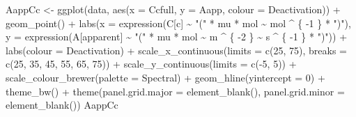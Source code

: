 \documentclass[
]{krantz}
\makeatletter
\newenvironment{Shaded}{\begin{snugshade}}{\end{snugshade}}
\newcommand{\AttributeTok}[1]{\textcolor[rgb]{0.77,0.63,0.00}{#1}}
\newcommand{\DecValTok}[1]{\textcolor[rgb]{0.00,0.00,0.81}{#1}}
\newcommand{\FunctionTok}[1]{\textcolor[rgb]{0.00,0.00,0.00}{#1}}
\newcommand{\NormalTok}[1]{#1}
\newcommand{\OtherTok}[1]{\textcolor[rgb]{0.56,0.35,0.01}{#1}}
\newcommand{\SpecialCharTok}[1]{\textcolor[rgb]{0.00,0.00,0.00}{#1}}
\newcommand{\StringTok}[1]{\textcolor[rgb]{0.31,0.60,0.02}{#1}}
\newenvironment{kframe}{%
\medskip{}
\setlength{\fboxsep}{.8em}
 \def\at@end@of@kframe{}%
 \ifinner\ifhmode%
  \def\at@end@of@kframe{\end{minipage}}%
  \begin{minipage}{\columnwidth}%
 \fi\fi%
 \def\FrameCommand##1{\hskip\@totalleftmargin \hskip-\fboxsep
 \colorbox{shadecolor}{##1}\hskip-\fboxsep
     \hskip-\linewidth \hskip-\@totalleftmargin \hskip\columnwidth}%
 \MakeFramed {\advance\hsize-\width
   \@totalleftmargin\z@ \linewidth\hsize
   \@setminipage}}%
 {\par\unskip\endMakeFramed%
 \at@end@of@kframe}
\renewenvironment{Shaded}{\begin{kframe}}{\end{kframe}}
\makeatother
\begin{document}
\begin{Shaded}
\begin{Highlighting}[]
\NormalTok{AappCc }\OtherTok{\textless{}{-}}
  \FunctionTok{ggplot}\NormalTok{(data, }\FunctionTok{aes}\NormalTok{(}\AttributeTok{x =}\NormalTok{ Ccfull, }\AttributeTok{y =}\NormalTok{ Aapp, }\AttributeTok{colour =}\NormalTok{ Deactivation)) }\SpecialCharTok{+}
  \FunctionTok{geom\_point}\NormalTok{() }\SpecialCharTok{+}
  \FunctionTok{labs}\NormalTok{(}\AttributeTok{x =} \FunctionTok{expression}\NormalTok{(C[c] }\SpecialCharTok{\textasciitilde{}} \StringTok{"("} \SpecialCharTok{*}\NormalTok{ mu }\SpecialCharTok{*}\NormalTok{ mol }\SpecialCharTok{\textasciitilde{}}\NormalTok{ mol }\SpecialCharTok{\^{}}\NormalTok{ \{}
    \SpecialCharTok{{-}}\DecValTok{1}
\NormalTok{  \} }\SpecialCharTok{*} \StringTok{")"}\NormalTok{),}
  \AttributeTok{y =} \FunctionTok{expression}\NormalTok{(A[apparent] }\SpecialCharTok{\textasciitilde{}} \StringTok{"("} \SpecialCharTok{*}\NormalTok{ mu }\SpecialCharTok{*}\NormalTok{ mol }\SpecialCharTok{\textasciitilde{}}\NormalTok{ m }\SpecialCharTok{\^{}}\NormalTok{ \{}
    \SpecialCharTok{{-}}\DecValTok{2}
\NormalTok{  \} }\SpecialCharTok{\textasciitilde{}}\NormalTok{ s }\SpecialCharTok{\^{}}\NormalTok{ \{}
    \SpecialCharTok{{-}}\DecValTok{1}
\NormalTok{  \} }\SpecialCharTok{*} \StringTok{")"}\NormalTok{)) }\SpecialCharTok{+}
  \FunctionTok{labs}\NormalTok{(}\AttributeTok{colour =} \StringTok{\textquotesingle{}Deactivation\textquotesingle{}}\NormalTok{) }\SpecialCharTok{+}
  \FunctionTok{scale\_x\_continuous}\NormalTok{(}\AttributeTok{limits =} \FunctionTok{c}\NormalTok{(}\DecValTok{25}\NormalTok{, }\DecValTok{75}\NormalTok{),}
                     \AttributeTok{breaks =} \FunctionTok{c}\NormalTok{(}\DecValTok{25}\NormalTok{, }\DecValTok{35}\NormalTok{, }\DecValTok{45}\NormalTok{, }\DecValTok{55}\NormalTok{, }\DecValTok{65}\NormalTok{, }\DecValTok{75}\NormalTok{)) }\SpecialCharTok{+}
  \FunctionTok{scale\_y\_continuous}\NormalTok{(}\AttributeTok{limits =} \FunctionTok{c}\NormalTok{(}\SpecialCharTok{{-}}\DecValTok{5}\NormalTok{, }\DecValTok{5}\NormalTok{)) }\SpecialCharTok{+}
  \FunctionTok{scale\_colour\_brewer}\NormalTok{(}\AttributeTok{palette =} \StringTok{\textquotesingle{}Spectral\textquotesingle{}}\NormalTok{) }\SpecialCharTok{+}
  \FunctionTok{geom\_hline}\NormalTok{(}\AttributeTok{yintercept =} \DecValTok{0}\NormalTok{) }\SpecialCharTok{+}
  \FunctionTok{theme\_bw}\NormalTok{() }\SpecialCharTok{+}
  \FunctionTok{theme}\NormalTok{(}\AttributeTok{panel.grid.major =} \FunctionTok{element\_blank}\NormalTok{(),}
        \AttributeTok{panel.grid.minor =} \FunctionTok{element\_blank}\NormalTok{())}
\NormalTok{AappCc}
\end{Highlighting}
\end{Shaded}
\end{document}
